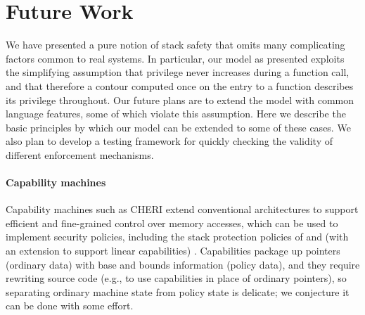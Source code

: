 \documentclass[acmsmall,review,anonymous]{acmart}\settopmatter{printfolios=true,printccs=false,printacmref=false}
\begin{document}
\section{Future Work}
  \label{sec:future}

  We have presented a pure notion of stack safety that omits many complicating
  factors common to real systems. In particular, our model as presented exploits
  the simplifying assumption that privilege never increases during a function
  call, and that therefore a contour computed once on the entry to a function
  describes its privilege throughout. Our future plans are to extend the model
  with common language features, some of which violate this assumption. Here we
  describe the basic principles by which our model can be extended to some of
  these cases. We also plan to develop a testing framework for quickly
  checking the validity of different enforcement mechanisms.

  \paragraph*{Capability machines}
  Capability machines such as CHERI \citep{Woodruff+14} extend conventional
  architectures to support efficient and fine-grained control over memory
  accesses, which can be used to implement security policies, including
  the stack protection policies of
  \citet{Skorstengaard+19b} and (with an extension to support linear capabilities) \citet{Skorstengaard+19}.
  Capabilities package up pointers
  (ordinary data) with base and bounds information (policy data),
  and they require rewriting source code (e.g., to use capabilities in place
  of ordinary pointers), so separating ordinary machine state from policy
  state is delicate; we conjecture it can be done with some effort.


\end{document}
